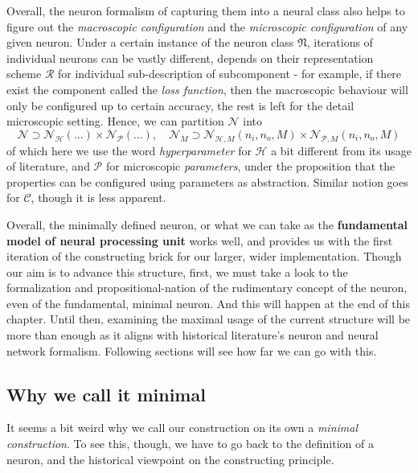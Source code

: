 Overall, the neuron formalism of capturing them into a neural class also helps to figure out the \textit{macroscopic configuration} and the \textit{microscopic configuration} of any given neuron. Under a certain instance of the neuron class $\mathfrak{N}$, iterations of individual neurons can be vastly different, depends on their representation scheme $\mathcal{R}$ for individual sub-description of subcomponent - for example, if there exist the component called the \textit{loss function}, then the macroscopic behaviour will only be configured up to certain accuracy, the rest is left for the detail microscopic setting. Hence, we can partition $\mathcal{N}$ into $$\mathcal{N}\supset \mathcal{N}_{\mathcal{H}}(\dots)\times \mathcal{N}_{\mathcal{P}}(\dots), \quad \mathcal{N}_{M}\supset \mathcal{N}_{\mathcal{H},M}(n_{i},n_{o},M)\times \mathcal{N}_{\mathcal{P},M}(n_{i},n_{o},M)$$
of which here we use the word \textit{hyperparameter} for $\mathcal{H}$ a bit different from its usage of literature, and $\mathcal{P}$ for microscopic \textit{parameters}, under the proposition that the properties can be configured using parameters as abstraction. Similar notion goes for $\mathcal{C}$, though it is less apparent. 

Overall, the minimally defined neuron, or what we can take as the \textbf{fundamental model of neural processing unit} works well, and provides us with the first iteration of the constructing brick for our larger, wider implementation. Though our aim is to advance this structure, first, we must take a look to the formalization and propositional-nation of the rudimentary concept of the neuron, even of the fundamental, minimal neuron. And this will happen at the end of this chapter. Until then, examining the maximal usage of the current structure will be more than enough as it aligns with historical literature's neuron and neural network formalism. Following sections will see how far we can go with this. 
\subsection{Why we call it minimal}

It seems a bit weird why we call our construction on its own a \textit{minimal construction}. To see this, though, we have to go back to the definition of a neuron, and the historical viewpoint on the constructing principle. 